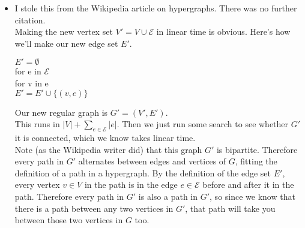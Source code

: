 \documentclass[11pt]{article}
\begin{document}
\begin{solution}
    \begin{itemize}
        \item I stole this from the Wikipedia article on hypergraphs. There was no further citation. 
            \\ Making the new vertex set $V' = V \cup \mathcal{E}$ in linear time is obvious. Here's how we'll make our new edge set $E'$.
            \begin{algo}
                $E' = \emptyset$
                \\ for e in $\mathcal{E}$ \+
                \\ for v in e \+
                \\ $E' = E' \cup \{(v, e)\}$ 
            \end{algo}
            Our new regular graph is $G' = (V', E')$.
            \\ This runs in $|V| + \sum_{e \in \mathcal{E}} |e|$. Then we just run some search to see whether $G'$ it is connected, which we know takes linear time.
            \\ Note (as the Wikipedia writer did) that this graph $G'$ is bipartite. Therefore every path in $G'$ alternates between edges and vertices of $G$, fitting the definition of a path in a hypergraph. By the definition of the edge set $E'$, every vertex $v \in V$ in the path is in the edge $e \in \mathcal{E}$ before and after it in the path. Therefore every path in $G'$ is also a path in $G'$, so since we know that there is a path between any two vertices in $G'$, that path will take you between those two vertices in $G$ too.
    \end{itemize}
\end{solution}

\end{document}
